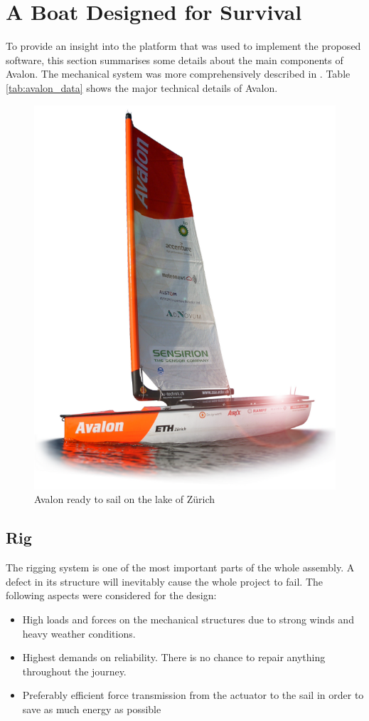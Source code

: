 \section{A Boat Designed for Survival}
To provide an insight into the platform that was used to implement the proposed
software, this section summarises some details about the main components of
{\sc Avalon}. The mechanical system was more comprehensively described in
\cite{giger2009}. Table \ref{tab:avalon_data} shows the major technical details
of {\sc Avalon}.
\begin{figure}[b!]
\centering
\includegraphics[height=0.8\columnwidth]{pics/avalon.png}
\caption{Avalon ready to sail on the lake of Z\"urich}
\label{fig:avalon}
\end{figure}

\subsection{Rig}
The rigging system is one of the most important parts of the whole
assembly. A defect in its structure will inevitably cause the whole project to
fail. The following aspects were considered for the design:
\begin{itemize}
\item High loads and forces on the mechanical structures due to
strong winds and heavy weather conditions.
\item Highest demands on reliability. There is no chance to
repair anything throughout the journey.
\item Preferably efficient force transmission from the actuator to the sail in order to save as much energy as
possible
\end{itemize}

